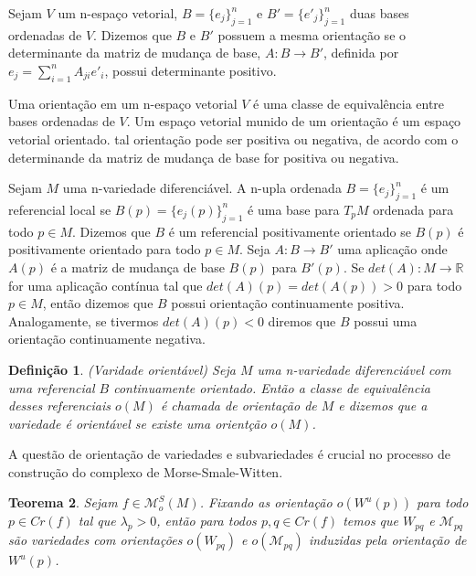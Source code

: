 \documentclass[12pt]{book}
\newtheorem{teorema}{Teorema}[section]
\newtheorem{definicao}[teorema]{Definição}
\newcommand{\espacomoduli}[2]{\mathcal{M}_{#1#2}}
\newcommand{\espacotangenteponto}[2]{T_{#1}#2}
\newcommand{\funcoesmorsesmale}[1]{\mathcal{M}^{S}_{o}(#1)}
\newcommand{\pontoscriticos}[1]{\textit{Cr}(#1)}
\newcommand{\real}[1]{\mathbb{R}^{#1}}
\newcommand{\reta}{\real{}}
\newcommand{\variedadeconectantepontos}[2]{W_{#1#2}}
\newcommand{\variedadeinstavel}[1]{W^{u}(#1)}
\begin{document}
	Sejam $V$ um n-espaço vetorial, $B=\{e_{j}\}_{j=1}^{n}$ e $B'=\{e'_{j}\}_{j=1}^{n}$ duas bases ordenadas de $V$. Dizemos que $B$ e $B'$ possuem a mesma orientação se o determinante da matriz de mudança de base, $A: B \to B'$, definida por $e_{j} = \sum_{i=1}^{n}A_{ji}e'_{i}$, possui determinante positivo. 
	
	Uma orientação em um n-espaço vetorial $V$ é uma classe de equivalência entre bases ordenadas de $V$. Um espaço vetorial munido de um orientação é um espaço vetorial orientado. tal orientação pode ser positiva ou negativa, de acordo com o determinande da matriz de mudança de base for positiva ou negativa.
	
	Sejam $M$ uma n-variedade diferenciável. A n-upla ordenada $B=\{e_{j}\}_{j=1}^{n}$ é um referencial local se $B(p)=\{e_{j}(p)\}_{j=1}^{n}$ é uma base para $\espacotangenteponto{p}{M}$ ordenada para todo $p \in M$. Dizemos que $B$ é um referencial positivamente orientado se $B(p)$ é positivamente orientado para todo $p \in M$. Seja $A: B \to B'$ uma aplicação onde $A(p)$ é a matriz de mudança de base $B(p) $ para $B'(p)$. Se $det(A):M \to \reta$ for uma aplicação contínua tal que $det(A)(p) = det(A(p))>0$ para todo $p \in M$, então dizemos que $B$ possui orientação continuamente positiva. Analogamente, se tivermos $det(A)(p)<0$ diremos que $B$ possui uma orientação continuamente negativa.
	
	\begin{definicao}
		(Varidade orientável) Seja $M$ uma n-variedade diferenciável com uma referencial $B$ continuamente orientado. Então a classe de equivalência desses referenciais $o(M)$ é chamada de orientação de $M$ e dizemos que a variedade é orientável se existe uma orientção $o(M)$.
	\end{definicao}
	
	A questão de orientação de variedades e subvariedades é crucial no processo de construção do complexo de Morse-Smale-Witten.
	
	\begin{teorema}\label{teorema_orientacao_variedade_instavel}
		Sejam $f \in \funcoesmorsesmale{M}$. Fixando as orientação $o(\variedadeinstavel{p})$ para todo $p \in \pontoscriticos{f}$ tal que $\lambda_{p}>0$, então para todos $p,q \in \pontoscriticos{f}$ temos que $\variedadeconectantepontos{p}{q}$ e $\espacomoduli{p}{q}$ são variedades com orientações $o(\variedadeconectantepontos{p}{q})$ e $o(\espacomoduli{p}{q})$ induzidas pela orientação de $\variedadeinstavel{p}$.
	\end{teorema}
	
\end{document}
